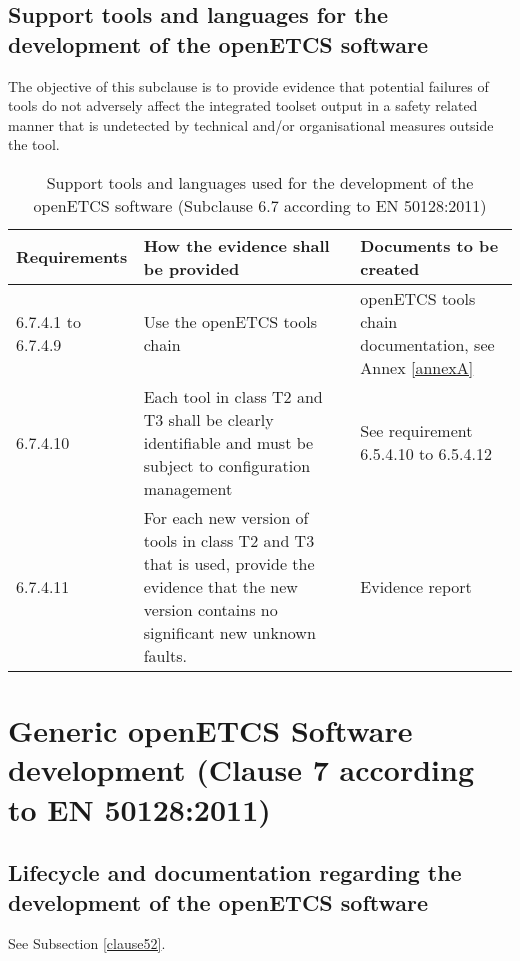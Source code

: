 \documentclass{template/openetcs_report}
\begin{document}
\subsection{Support tools and languages for the development of the openETCS software}
\begin{flushleft}
The objective of this subclause is to provide evidence that potential failures of tools do not adversely affect the integrated toolset output in a safety related manner that is undetected by technical and/or organisational measures outside the tool.
\end{flushleft}
{\footnotesize\sffamily\centering
\begin{longtable}{|p{2cm}|p{9cm}|p{3cm}|}
\caption{Support tools and languages used for the development of the openETCS software  (Subclause 6.7 according to EN 50128:2011)}\\
\hline
\bfseries Requirements & \bfseries How the evidence shall be provided & \bfseries Documents to be created\\
\hline
\hline
\endhead
\hline
\endfoot

6.7.4.1 to 6.7.4.9 & Use the openETCS tools chain & openETCS tools chain documentation, see Annex \ref{annexA}\\ 
\hline
6.7.4.10 & Each tool in class T2 and T3 shall be clearly identifiable and must be subject to configuration management & See requirement 6.5.4.10 to 6.5.4.12\\ 
\hline
6.7.4.11 & For each new version of tools in class T2 and T3 that is used, provide the evidence that the new version contains no significant new unknown faults. & Evidence report\\  
\hline
\end{longtable}}



\section{Generic openETCS Software development (Clause 7 according to EN 50128:2011)}
\label{clause72}
\subsection{Lifecycle and documentation regarding the development of the openETCS software}
See Subsection \ref{clause52}.
\end{document}
